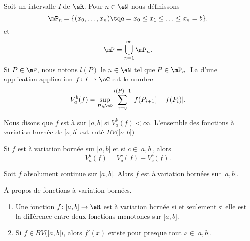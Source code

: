 \begin{definition}	\label{DEFooLANWooGnVGPV}
	Soit un intervalle \( I\) de \( \eR\). Pour \( n\in \eN\) nous définissons
	\begin{equation}
		\mP_n=\{ (x_0,\ldots,x_n)\tq a=x_0\leq x_1\leq\ldots\leq x_n=b \}.
	\end{equation}
	et
	\begin{equation}
		\mP=\bigcup_{n=1}^{\infty}\mP_n.
	\end{equation}
	Si \( P\in \mP\), nous notons \( l(P)\) le \( n\in \eN\) tel que \( P\in\mP_n\). La  d'une application application \(f \colon I\to \eC  \) est le nombre
	\begin{equation}
		V_a^b(f)=\sup_{P\in\mP}\sum_{i=0}^{l(P)-1}| f(P_{i+1})-f(P_i) |.
	\end{equation}

	Nous disons que \( f\) est à  sur \( \mathopen[ a,b\mathclose]\) si \( V_a^b(f)<\infty\). L'ensemble des fonctions à variation bornée de \( \mathopen[ a,b\mathclose]\) est noté \( BV\big( \mathopen[ a,b\mathclose] \big)\).
\end{definition}

\begin{proposition}	\label{PROPooDJTDooMMWMcS}
	Si \( f\) est à variation bornée sur \( \mathopen[ a,b\mathclose]\) et si \( c\in \mathopen[ a,b\mathclose]\), alors
	\begin{equation}
		V_a^b(f)=V_a^c(f)+V_c^b(f).
	\end{equation}
\end{proposition}


\begin{proposition}	\label{PROPooMONZooWVkYWb}
	Soit \( f\) absolument continue sur \( \mathopen[ a,b\mathclose]\). Alors \( f\) est à variation bornées sur \( \mathopen[ a,b\mathclose]\).
\end{proposition}


\begin{proposition}	\label{PROPooVHGNooSDlrrq}
	À propos de fonctions à variation bornées.
	\begin{enumerate}
		\item
		      Une fonction \(f \colon \mathopen[ a,b\mathclose]\to \eR  \) est à variation bornée si et seulement si elle est la différence entre deux fonctions monotones sur \( \mathopen[ a,b\mathclose]\).
		\item
		      Si \( f\in BV\big( \mathopen[ a,b\mathclose] \big)\), alors \( f'(x)\) existe pour presque tout \( x\in \mathopen[ a,b\mathclose]\).
	\end{enumerate}
\end{proposition}


